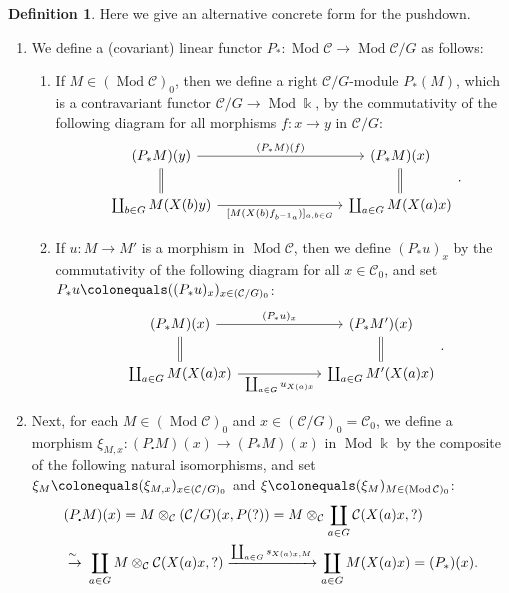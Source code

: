 \documentclass{surv-l}
\numberwithin{equation}{chapter}
\numberwithin{figure}{chapter}
\theoremstyle{plain}
\theoremstyle{definition}
\newtheorem{dfn}[thm]{Definition}
\theoremstyle{remark}
\newcommand{\isoto}{\
  \raise.8ex\hbox{$^{\sim}$}\kern-.7em\hbox{$\to$}\ }
\newcommand{\Ar}[3]{\ar[from={#1}, to={#2}, #3]}
\DeclareMathOperator{\Mod}{Mod}
\begin{document}
\begin{dfn}\label{dfn:another-pi-down}
Here we give an alternative concrete form for the pushdown.
\begin{enumerate}
\item
We define a (covariant) linear functor $P_* \colon \Mod {\mathcal{C}} \to \Mod {\mathcal{C}}/G$ as follows:
\begin{enumerate}
\item
If $M \in (\Mod{\mathcal{C}})_0$, then we define a right ${\mathcal{C}}/G$-module
$P_*(M)$, which is a contravariant functor ${\mathcal{C}}/G \to \Mod\Bbbk$, by
the commutativity of the following diagram for all morphisms
$f \colon x \to y$ in ${\mathcal{C}}/G$:
\[
\begin{tikzcd}[column sep=9em]
(P_* M)(y) & (P_* M)(x)\\
\coprod_{b\in G} M(X(b)y) & \coprod_{a\in G} M(X(a)x)
\Ar{1-1}{1-2}{"{(P_* M)(f)}"}
\Ar{2-1}{2-2}{"{[M(X(b)f_{b^{-1} a})]_{a,b \in G}}" '}
\Ar{1-1}{2-1}{equal}
\Ar{1-2}{2-2}{equal}
\end{tikzcd}.
\]
\item
If $u \colon M \to M'$ is a morphism in $\Mod {\mathcal{C}}$, then we define
$(P_* u)_x$ by the commutativity of the following diagram for all
$x \in {\mathcal{C}}_0$, and set $P_* u\colonequals  ((P_* u)_x)_{x \in ({\mathcal{C}}/G)_0}$:
\begin{equation}\label{eq:df-down-u}
\begin{tikzcd}[column sep=6em]
(P_* M)(x) & (P_* M')(x)\\
\coprod_{a\in G} M(X(a)x) & \coprod_{a\in G} M'(X(a)x)
\Ar{1-1}{1-2}{"{(P_* u)_x}"}
\Ar{2-1}{2-2}{"{\coprod_{a\in G}u_{X(a)x}}" '}
\Ar{1-1}{2-1}{equal}
\Ar{1-2}{2-2}{equal}
\end{tikzcd}.
\end{equation}
\end{enumerate}

\item
Next, for each $M \in (\Mod {\mathcal{C}})_0$ and $x \in ({\mathcal{C}}/G)_0 = {\mathcal{C}}_0$,
we define a morphism $\xi_{M,x} \colon (P_{\centerdot} M)(x) \to (P_* M)(x)$
in $\Mod \Bbbk$ by the composite of the following natural isomorphisms, and set
$\xi_M\colonequals  (\xi_{M,x})_{x \in ({\mathcal{C}}/G)_0}$ and $\xi\colonequals  (\xi_M)_{M \in (\Mod{\mathcal{C}})_0}$:
\[
\begin{aligned}
&(P_{\centerdot} M)(x) = M \otimes_{\mathcal{C}}({\mathcal{C}}/G)(x, P(?)) = M \otimes_{\mathcal{C}} \coprod_{a\in G}{\mathcal{C}}(X(a)x, ?)\\
&\isoto \coprod_{a\in G}M \otimes_{\mathcal{C}} {\mathcal{C}}(X(a)x, ?)
\xrightarrow{\coprod_{a\in G}s_{X(a)x, M}} \coprod_{a\in G} M(X(a)x) = (P_*)(x).
\end{aligned}
\]
\end{enumerate}
\end{dfn}
\end{document}
